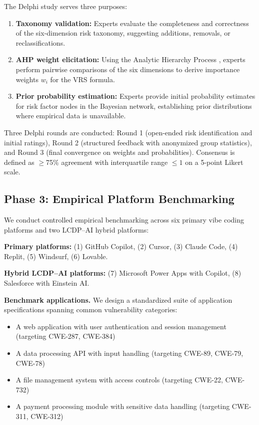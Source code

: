\documentclass[preprint,review,12pt]{elsarticle}
\begin{document}
The Delphi study serves three purposes:
\begin{enumerate}
    \item \textbf{Taxonomy validation:} Experts evaluate the completeness and correctness of the six-dimension risk taxonomy, suggesting additions, removals, or reclassifications.
    \item \textbf{AHP weight elicitation:} Using the Analytic Hierarchy Process \cite{saaty1980ahp, saaty2008ahp}, experts perform pairwise comparisons of the six dimensions to derive importance weights $w_i$ for the VRS formula.
    \item \textbf{Prior probability estimation:} Experts provide initial probability estimates for risk factor nodes in the Bayesian network, establishing prior distributions where empirical data is unavailable.
\end{enumerate}

Three Delphi rounds are conducted: Round 1 (open-ended risk identification and initial ratings), Round 2 (structured feedback with anonymized group statistics), and Round 3 (final convergence on weights and probabilities). Consensus is defined as $\geq$75\% agreement with interquartile range $\leq 1$ on a 5-point Likert scale.


\subsection{Phase 3: Empirical Platform Benchmarking}
\label{subsec:phase3}

We conduct controlled empirical benchmarking across six primary vibe coding platforms and two LCDP--AI hybrid platforms:

\textbf{Primary platforms:} (1) GitHub Copilot, (2) Cursor, (3) Claude Code, (4) Replit, (5) Windsurf, (6) Lovable.

\textbf{Hybrid LCDP--AI platforms:} (7) Microsoft Power Apps with Copilot, (8) Salesforce with Einstein AI.

\textbf{Benchmark applications.} We design a standardized suite of application specifications spanning common vulnerability categories:
\begin{itemize}
    \item A web application with user authentication and session management (targeting CWE-287, CWE-384)
    \item A data processing API with input handling (targeting CWE-89, CWE-79, CWE-78)
    \item A file management system with access controls (targeting CWE-22, CWE-732)
    \item A payment processing module with sensitive data handling (targeting CWE-311, CWE-312)
\end{itemize}
\end{document}
